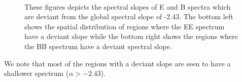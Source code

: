 \documentclass[12pt]{article}
\begin{document}
\begin{figure}[!h]
\centering
{}\\
\caption{These figures depicts the spectral slopes  of E and B spectra which are deviant from the global spectral slope of -2.43. The bottom left shows the spatial distribution of regions where the EE spectrum have a deviant slope while the bottom right shows the regions where the BB spectrum have a deviant spectral slope.}
\label{fig:eb_slope_dev}
\end{figure}

We note that most of the regions with a deviant slope are seen to have a shallower spectrum ($\alpha > -2.43$).
\end{document}
